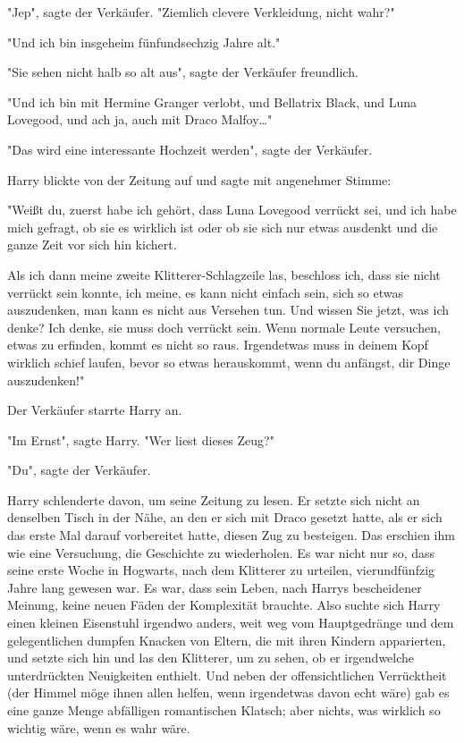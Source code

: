 {"Jep", sagte der Verkäufer. "Ziemlich clevere Verkleidung, nicht wahr?"

"Und ich bin insgeheim fünfundsechzig Jahre alt."

"Sie sehen nicht halb so alt aus", sagte der Verkäufer freundlich.

"Und ich bin mit Hermine Granger verlobt, und Bellatrix Black, und Luna Lovegood, und ach ja, auch mit Draco Malfoy…"

"Das wird eine interessante Hochzeit werden", sagte der Verkäufer.

Harry blickte von der Zeitung auf und sagte mit angenehmer Stimme:

"Weißt du, zuerst habe ich gehört, dass Luna Lovegood verrückt sei, und ich habe mich gefragt, ob sie es wirklich ist oder ob sie sich nur etwas ausdenkt und die ganze Zeit vor sich hin kichert.

Als ich dann meine zweite Klitterer-Schlagzeile las, beschloss ich, dass sie nicht verrückt sein konnte, ich meine, es kann nicht einfach sein, sich so etwas auszudenken, man kann es nicht aus Versehen tun. Und wissen Sie jetzt, was ich denke? Ich denke, sie muss doch verrückt sein. Wenn normale Leute versuchen, etwas zu erfinden, kommt es nicht so raus. Irgendetwas muss in deinem Kopf wirklich schief laufen, bevor so etwas herauskommt, wenn du anfängst, dir Dinge auszudenken!"

Der Verkäufer starrte Harry an.

"Im Ernst", sagte Harry. "Wer liest dieses Zeug?"

"Du", sagte der Verkäufer.

Harry schlenderte davon, um seine Zeitung zu lesen. Er setzte sich nicht an denselben Tisch in der Nähe, an den er sich mit Draco gesetzt hatte, als er sich das erste Mal darauf vorbereitet hatte, diesen Zug zu besteigen. Das erschien ihm wie eine Versuchung, die Geschichte zu wiederholen. Es war nicht nur so, dass seine erste Woche in Hogwarts, nach dem Klitterer zu urteilen, vierundfünfzig Jahre lang gewesen war. Es war, dass sein Leben, nach Harrys bescheidener Meinung, keine neuen Fäden der Komplexität brauchte. Also suchte sich Harry einen kleinen Eisenstuhl irgendwo anders, weit weg vom Hauptgedränge und dem gelegentlichen dumpfen Knacken von Eltern, die mit ihren Kindern apparierten, und setzte sich hin und las den Klitterer, um zu sehen, ob er irgendwelche unterdrückten Neuigkeiten enthielt. Und neben der offensichtlichen Verrücktheit (der Himmel möge ihnen allen helfen, wenn irgendetwas davon echt wäre) gab es eine ganze Menge abfälligen romantischen Klatsch; aber nichts, was wirklich so wichtig wäre, wenn es wahr wäre.

}
